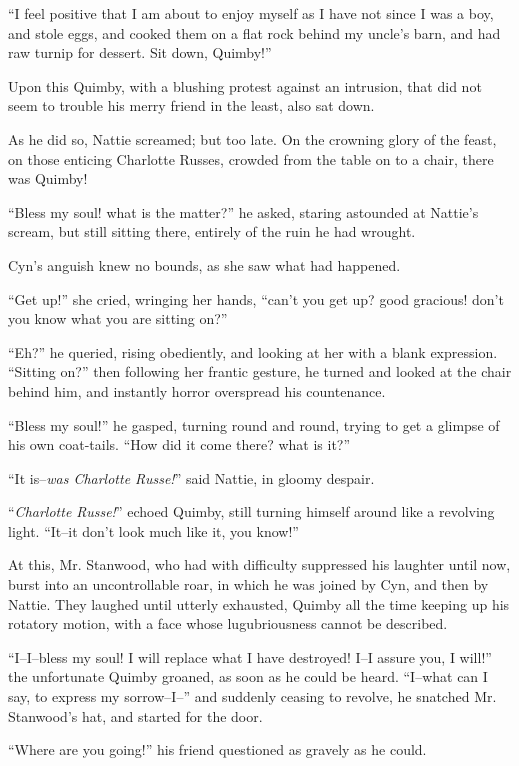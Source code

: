 ``I feel positive that I am about to enjoy myself as I have not since I
was a boy, and stole eggs, and cooked them on a flat rock behind my
uncle's barn, and had raw turnip for dessert. Sit down, Quimby!''

Upon this Quimby, with a blushing protest against an intrusion, that did
not seem to trouble his merry friend in the least, also sat down.

As he did so, Nattie screamed; but too late. On the crowning glory of
the feast, on those enticing Charlotte Russes, crowded from the table on
to a chair, there was Quimby!

``Bless my soul! what is the matter?'' he asked, staring astounded at
Nattie's scream, but still sitting there, entirely of the
ruin he had wrought.

Cyn's anguish knew no bounds, as she saw what had happened.

``Get up!'' she cried, wringing her hands, ``can't you get up? good
gracious! don't you know what you are sitting on?''

``Eh?'' he queried, rising obediently, and looking at her with a blank
expression. ``Sitting on?'' then following her frantic gesture, he turned
and looked at the chair behind him, and instantly horror overspread his
countenance.

``Bless my soul!'' he gasped, turning round and round, trying to get a
glimpse of his own coat-tails. ``How did it come there? what is it?''

``It is--\emph{was Charlotte Russe!}'' said Nattie, in gloomy despair.

``\emph{Charlotte Russe!}'' echoed Quimby, still turning himself around like a
revolving light. ``It--it don't look much like it, you know!''

At this, Mr. Stanwood, who had with difficulty suppressed his laughter
until now, burst into an uncontrollable roar, in which he was joined by
Cyn, and then by Nattie. They laughed until utterly exhausted, Quimby
all the time keeping up his rotatory motion, with a face whose
lugubriousness cannot be described.

``I--I--bless my soul! I will replace what I have destroyed! I--I assure
you, I will!'' the unfortunate Quimby groaned, as soon as he could be
heard. ``I--what can I say, to express my sorrow--I--'' and suddenly
ceasing to revolve, he snatched Mr. Stanwood's hat, and started for the
door.

``Where are you going!'' his friend questioned as gravely as he could.

